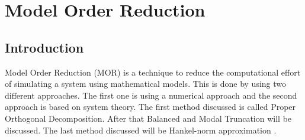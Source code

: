 \nopagebreak
\chapter{Model Order Reduction}
\section{Introduction}
Model Order Reduction (MOR) is a technique to reduce the computational effort of simulating a system using mathematical models.
This is done by using two different approaches. The first one is using a numerical approach and the second approach is based on system theory.
The first method discussed is called Proper Orthogonal Decomposition. After that Balanced and Modal Truncation will be discussed.
The last method discussed will be Hankel-norm approximation \cite{+2021}.

